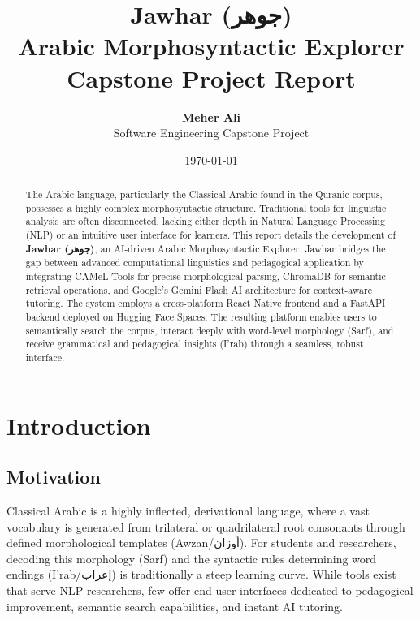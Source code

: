 \documentclass[11pt, a4paper]{article}
\title{
    \vspace{2cm}
    \textbf{\huge Jawhar (\textarabic{جوهر})} \\
    \vspace{0.5cm}
    \Large Arabic Morphosyntactic Explorer \\
    \vspace{1cm}
    \large Capstone Project Report
    \vspace{2cm}
}
\author{\textbf{Meher Ali} \\ Software Engineering Capstone Project}
\date{\vspace{1cm} \today}
\begin{document}
\maketitle
\thispagestyle{empty}
\newpage

\begin{abstract}
\noindent 
The Arabic language, particularly the Classical Arabic found in the Quranic corpus, possesses a highly complex morphosyntactic structure. Traditional tools for linguistic analysis are often disconnected, lacking either depth in Natural Language Processing (NLP) or an intuitive user interface for learners. This report details the development of \textbf{Jawhar (\textarabic{جوهر})}, an AI-driven Arabic Morphosyntactic Explorer. Jawhar bridges the gap between advanced computational linguistics and pedagogical application by integrating CAMeL Tools for precise morphological parsing, ChromaDB for semantic retrieval operations, and Google's Gemini Flash AI architecture for context-aware tutoring. The system employs a cross-platform React Native frontend and a FastAPI backend deployed on Hugging Face Spaces. The resulting platform enables users to semantically search the corpus, interact deeply with word-level morphology (Sarf), and receive grammatical and pedagogical insights (I'rab) through a seamless, robust interface.
\end{abstract}

\tableofcontents
\newpage
{}

\section{Introduction}

\subsection{Motivation}
Classical Arabic is a highly inflected, derivational language, where a vast vocabulary is generated from trilateral or quadrilateral root consonants through defined morphological templates (\textarabic{Awzan/أوزان}). For students and researchers, decoding this morphology (Sarf) and the syntactic rules determining word endings (\textarabic{I'rab/إعراب}) is traditionally a steep learning curve. While tools exist that serve NLP researchers, few offer end-user interfaces dedicated to pedagogical improvement, semantic search capabilities, and instant AI tutoring.
\end{document}
